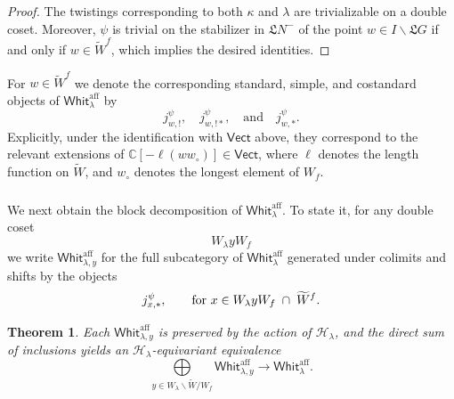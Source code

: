 \documentclass[11pt,reqno]{amsart}
\newcommand{\sH}{\mathscr{H}}
\newcommand{\aff}{\operatorname{aff}}
\newcommand{\fL}{\mathfrak{L}}
\newtheorem{theo}[subsubsection]{Theorem}
\theoremstyle{remark}
\numberwithin{equation}{section}
\newcommand{\Vect}{\mathsf{Vect}}
\newcommand{\Whit}{\mathsf{Whit}}
\begin{document}
\begin{proof}The twistings corresponding to both $\kappa$ and $\lambda$
	are trivializable on a double coset. Moreover, $\psi$ is trivial
	on the stabilizer in $\fL N^-$ of the point
	$w \in I\backslash\fL G$ if and only if $w \in \widetilde{W}^f$, which 
	implies the desired identities. 
\end{proof}

%
%

For $w \in \widetilde{W}^f$ we denote the corresponding standard, simple, 
and 
costandard 
objects of $\Whit_{\lambda}^{\aff}$ by 
%
\[ j_{w, !}^\psi, \quad  
j_{w, !*}^\psi, \quad \text{and} \quad j_{w, *}^\psi.\]
%
Explicitly, under the identification with 
$\Vect$ above, they correspond to the relevant
extensions of $\mathbb{C}[-\ell(ww_{\circ})] \in \Vect$,
where $\ell$ denotes the length function on $\widetilde{W}$, and $w_\circ$ 
denotes the 
longest element of $W_f$. 

\subsubsection{}We next obtain the block decomposition of 
$\Whit_{\lambda}^{\aff}$. To state it, for any double coset $$W_\lambda y 
W_f$$we write 
$\Whit_{\lambda,y}^{\aff}$ 
for the full subcategory of $\Whit_{\lambda}^{\aff}$ generated under colimits 
and shifts by the objects 
%
\[
j_{x, *}^\psi, \quad \quad \text{for } x \in W_\lambda y W_f 
\hspace{1mm}\cap \hspace{1mm} 
{\widetilde{W}^f}.
\]


\begin{theo}\label{t:whit-blocks} Each $\Whit_{\lambda, y}^{\aff}$ is preserved 
by the 
	action of $\sH_\lambda$, and the direct sum of inclusions yields an 
	$\sH_\lambda$-equivariant equivalence 
	\begin{equation} \label{e:blockwhit}
	\underset{ y \in W_\lambda \backslash \widetilde{W} / W_f }
	{\bigoplus} \Whit_{\lambda, y}^{\aff} 
	\to \Whit_\lambda^{\aff}.
	\end{equation}
\end{theo}
\end{document}
